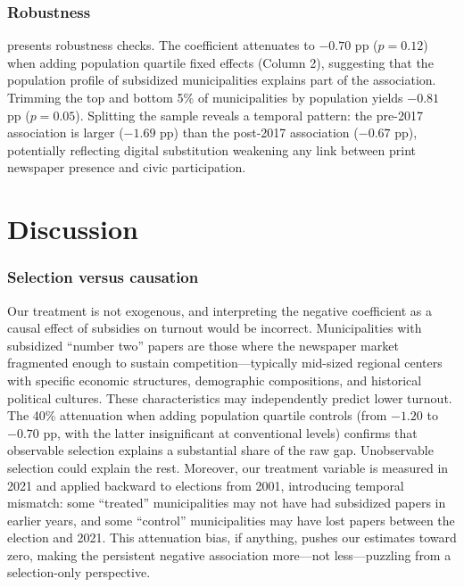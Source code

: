\documentclass[12pt]{article}
\begin{document}


\subsubsection*{Robustness}  presents robustness checks. The coefficient attenuates to $-0.70$ pp ($p = 0.12$) when adding population quartile fixed effects (Column 2), suggesting that the population profile of subsidized municipalities explains part of the association. Trimming the top and bottom 5\% of municipalities by population yields $-0.81$ pp ($p = 0.05$). Splitting the sample reveals a temporal pattern: the pre-2017 association is larger ($-1.69$ pp) than the post-2017 association ($-0.67$ pp), potentially reflecting digital substitution weakening any link between print newspaper presence and civic participation.



\section{Discussion} \label{sec:discussion}

\subsubsection*{Selection versus causation} Our treatment is not exogenous, and interpreting the negative coefficient as a causal effect of subsidies on turnout would be incorrect. Municipalities with subsidized ``number two'' papers are those where the newspaper market fragmented enough to sustain competition---typically mid-sized regional centers with specific economic structures, demographic compositions, and historical political cultures. These characteristics may independently predict lower turnout. The 40\% attenuation when adding population quartile controls (from $-1.20$ to $-0.70$ pp, with the latter insignificant at conventional levels) confirms that observable selection explains a substantial share of the raw gap. Unobservable selection could explain the rest. Moreover, our treatment variable is measured in 2021 and applied backward to elections from 2001, introducing temporal mismatch: some ``treated'' municipalities may not have had subsidized papers in earlier years, and some ``control'' municipalities may have lost papers between the election and 2021. This attenuation bias, if anything, pushes our estimates toward zero, making the persistent negative association more---not less---puzzling from a selection-only perspective.
\end{document}
